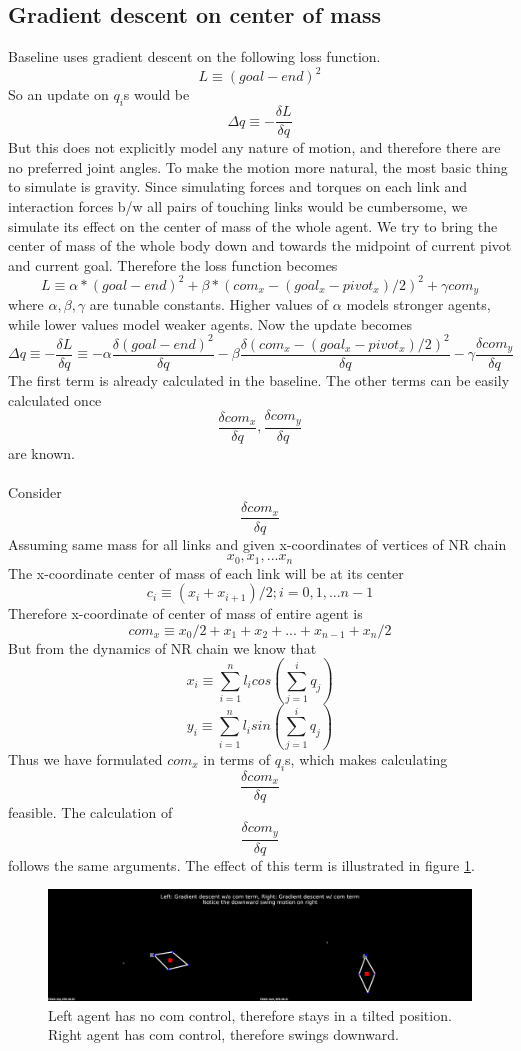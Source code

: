 \documentclass[12pt]{article}
\begin{document}
\subsection{Gradient descent on center of mass}
Baseline uses gradient descent on the following loss function.
\[
    L \equiv (goal - end)^2
\]
So an update on $q_i$s would be
\[
    \Delta q \equiv -\frac{\delta L}{\delta q}
\]
But this does not explicitly model any nature of motion, and therefore there are no preferred joint angles.
To make the motion more natural, the most basic thing to simulate is gravity.
Since simulating forces and torques on each link and interaction forces b/w all pairs of touching links would be cumbersome, we simulate its effect on the center of mass of the whole agent.
We try to bring the center of mass of the whole body down and towards the midpoint of current pivot and current goal.
Therefore the loss function becomes
\[
    L \equiv \alpha * (goal - end)^2 + \beta * (com_x - (goal_x - pivot_x) / 2)^2 + \gamma com_y
\]
where $\alpha, \beta, \gamma$ are tunable constants.
Higher values of $\alpha$ models stronger agents, while lower values model weaker agents.
Now the update becomes
\[
    \Delta q
    \equiv -\frac{\delta L}{\delta q}
    \equiv
    - \alpha \frac{\delta (goal - end)^2 }{\delta q}
    - \beta \frac{\delta (com_x - (goal_x - pivot_x) / 2)^2 }{\delta q}
    - \gamma \frac{\delta com_y}{\delta q}
\]
The first term is already calculated in the baseline.
The other terms can be easily calculated once
\[
    \frac{\delta com_x }{\delta q},
    \frac{\delta com_y }{\delta q}
\]
are known.
\\\\
Consider
\[
    \frac{\delta com_x }{\delta q}
\]
Assuming same mass for all links and given x-coordinates of vertices of NR chain
\[
    x_0, x_1, ... x_n
\]
The x-coordinate center of mass of each link will be at its center
\[
    c_i \equiv (x_i + x_{i + 1}) / 2; i = 0, 1, ... n - 1
\]
Therefore x-coordinate of center of mass of entire agent is
\[
    com_x \equiv x_0/2 + x_1 + x_2 + ... + x_{n-1} + x_n / 2
\]
But from the dynamics of NR chain we know that
\[
    x_i \equiv \sum_{i = 1}^{n} l_i cos(\sum_{j = 1}^{i} q_j)
\]
\[
    y_i \equiv \sum_{i = 1}^{n} l_i sin(\sum_{j = 1}^{i} q_j)
\]
Thus we have formulated $com_x$ in terms of $q_i$s, which makes calculating
\[
    \frac{\delta com_x }{\delta q}
\]
feasible.
The calculation of
\[
    \frac{\delta com_y }{\delta q}
\]
follows the same arguments.
The effect of this term is illustrated in figure \ref{fig:com_effect}.
\begin{figure}[h]
    \centering
    \includegraphics[width=16cm]{figures/com_effect.jpg}
    \caption{Left agent has no com control, therefore stays in a tilted position. Right agent has com control, therefore swings downward.}
    \label{fig:com_effect}
\end{figure}
\end{document}
